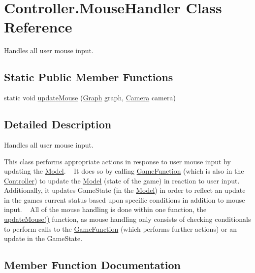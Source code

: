 \hypertarget{class_controller_1_1_mouse_handler}{}\section{Controller.\+Mouse\+Handler Class Reference}
\label{class_controller_1_1_mouse_handler}


Handles all user mouse input.  


\subsection*{Static Public Member Functions}
\begin{DoxyCompactItemize}
\item 
static void \hyperlink{class_controller_1_1_mouse_handler_a50940e57cc30125442c3783f8da9ab6e}{update\+Mouse} (\hyperlink{class_model_1_1_map_module_1_1_graph}{Graph} graph, \hyperlink{class_view_1_1_camera}{Camera} camera)
\end{DoxyCompactItemize}


\subsection{Detailed Description}
Handles all user mouse input. 

This class performs appropriate actions in response to user mouse input by updating the \hyperlink{namespace_model}{Model}. ~\newline
It does so by calling \hyperlink{class_controller_1_1_game_function}{Game\+Function} (which is also in the \hyperlink{namespace_controller}{Controller}) to update the \hyperlink{namespace_model}{Model} (state of the game) in reaction to user input. Additionally, it updates Game\+State (in the \hyperlink{namespace_model}{Model}) in order to reflect an update in the game\textquotesingle{}s current status based upon specific conditions in addition to mouse input. ~\newline
All of the mouse handling is done within one function, the \hyperlink{class_controller_1_1_mouse_handler_a50940e57cc30125442c3783f8da9ab6e}{update\+Mouse()} function, as mouse handling only consists of checking conditionals to perform calls to the \hyperlink{class_controller_1_1_game_function}{Game\+Function} (which performs further actions) or an update in the Game\+State. 

\subsection{Member Function Documentation}
\hypertarget{class_controller_1_1_mouse_handler_a50940e57cc30125442c3783f8da9ab6e}{}\label{class_controller_1_1_mouse_handler_a50940e57cc30125442c3783f8da9ab6e} 
